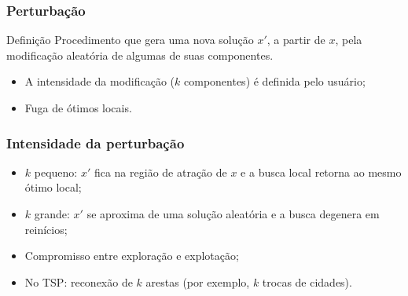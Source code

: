 \documentclass[fleqn]{beamer}
\newcommand{\vetor}[2]{%
	\foreach \v [count=\i] in {#2}{%
		\node[bit\v] at (\i*0.65,#1) {\v};
	}%
}
\newcommand{\destaque}[2]{%
	\draw[red,very thick] ({#2*0.65-0.3},{#1-0.3}) rectangle ({#2*0.65+0.3},{#1+0.3});
}
\begin{document}
\begin{frame}
	\frametitle{Perturbação}
	\begin{block}{Definição}
		Procedimento que gera uma nova solução $x'$, a partir de $x$, pela
		modificação aleatória de algumas de suas componentes.
	\end{block}
	\begin{itemize}
		\item A intensidade da modificação ($k$ componentes) é definida
			pelo usuário;
		\item Fuga de ótimos locais.
	\end{itemize}
	\vspace{2mm}
	\begin{center}
	\end{center}
\end{frame}

\begin{frame}
	\frametitle{Intensidade da perturbação}
	\begin{itemize}
		\item $k$ pequeno: $x'$ fica na região de atração de $x$ e a
			busca local retorna ao mesmo ótimo local;
		\item $k$ grande: $x'$ se aproxima de uma solução aleatória e a
			busca degenera em reinícios;
		\item Compromisso entre exploração e explotação;
		\item No TSP: reconexão de $k$ arestas (por exemplo, $k$ trocas de
			cidades).
	\end{itemize}
\end{frame}
\end{document}
